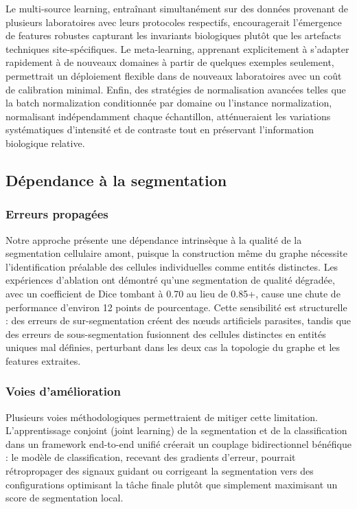 Le multi-source learning, entraînant simultanément sur des données provenant de plusieurs laboratoires avec leurs protocoles respectifs, encouragerait l'émergence de features robustes capturant les invariants biologiques plutôt que les artefacts techniques site-spécifiques. Le meta-learning, apprenant explicitement à s'adapter rapidement à de nouveaux domaines à partir de quelques exemples seulement, permettrait un déploiement flexible dans de nouveaux laboratoires avec un coût de calibration minimal. Enfin, des stratégies de normalisation avancées telles que la batch normalization conditionnée par domaine ou l'instance normalization, normalisant indépendamment chaque échantillon, atténueraient les variations systématiques d'intensité et de contraste tout en préservant l'information biologique relative.

\subsection{Dépendance à la segmentation}

\subsubsection{Erreurs propagées}

Notre approche présente une dépendance intrinsèque à la qualité de la segmentation cellulaire amont, puisque la construction même du graphe nécessite l'identification préalable des cellules individuelles comme entités distinctes. Les expériences d'ablation ont démontré qu'une segmentation de qualité dégradée, avec un coefficient de Dice tombant à 0.70 au lieu de 0.85+, cause une chute de performance d'environ 12 points de pourcentage. Cette sensibilité est structurelle : des erreurs de sur-segmentation créent des nœuds artificiels parasites, tandis que des erreurs de sous-segmentation fusionnent des cellules distinctes en entités uniques mal définies, perturbant dans les deux cas la topologie du graphe et les features extraites.

\subsubsection{Voies d'amélioration}

Plusieurs voies méthodologiques permettraient de mitiger cette limitation. L'apprentissage conjoint (joint learning) de la segmentation et de la classification dans un framework end-to-end unifié créerait un couplage bidirectionnel bénéfique : le modèle de classification, recevant des gradients d'erreur, pourrait rétropropager des signaux guidant ou corrigeant la segmentation vers des configurations optimisant la tâche finale plutôt que simplement maximisant un score de segmentation local.

